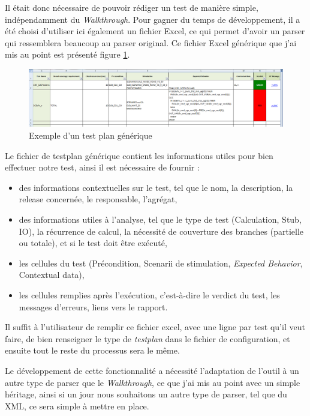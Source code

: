 Il était donc nécessaire de pouvoir rédiger un test de manière simple, indépendamment du \textit{Walkthrough}. Pour gagner du temps de développement, il a été choisi d'utiliser ici également un fichier Excel, ce qui permet d'avoir un parser qui ressemblera beaucoup au parser original. Ce fichier Excel générique que j'ai mis au point est présenté figure \ref{fig:gttestplan}. 


\begin{figure}[h]
\hspace{-40px}
\includegraphics[width=1.15\linewidth]{contents/images/gttestplan}
\caption{Exemple d'un test plan générique}
\label{fig:gttestplan}
\end{figure}

Le fichier de testplan générique contient les informations utiles pour bien effectuer notre test, ainsi il est nécessaire de fournir : 
\begin{itemize}
	\item des informations contextuelles sur le test, tel que le nom, la description, la release concernée, le responsable, l'agrégat,
	\item des informations utiles à l'analyse, tel que le type de test (Calculation, Stub, IO), la récurrence de calcul, la nécessité de couverture des branches (partielle ou totale), et si le test doit être exécuté,
	\item les cellules du test (Précondition, Scenarii de stimulation, \textit{Expected Behavior}, Contextual data),
	\item les cellules remplies après l'exécution, c'est-à-dire le verdict du test, les messages d'erreurs, liens vers le rapport.
\end{itemize}
Il suffit à l'utilisateur de remplir ce fichier excel, avec une ligne par test qu'il veut faire, de bien renseigner le type de \textit{testplan} dans le fichier de configuration, et ensuite tout le reste du processus sera le même.

Le développement de cette fonctionnalité a nécessité l'adaptation de l'outil à un autre type de parser que le \textit{Walkthrough}, ce que j'ai mis au point avec un simple héritage, ainsi si un jour nous souhaitons un autre type de parser, tel que du XML, ce sera simple à mettre en place. 

